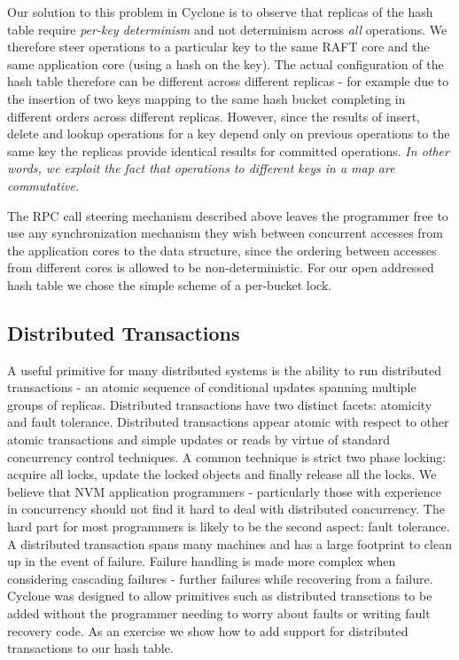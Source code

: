 \documentclass[letterpaper,twocolumn,10pt]{article}
\begin{document}
Our solution to this problem in Cyclone is to observe that replicas of the hash
table require \emph{per-key determinism} and not determinism across \emph{all}
operations. We therefore steer operations to a particular key to the same RAFT
core and the same application core (using a hash on the key).  The actual
configuration of the hash table therefore can be different across different
replicas - for example due to the insertion of two keys mapping to the same hash
bucket completing in different orders across different replicas. However, since
the results of insert, delete and lookup operations for a key depend only on
previous operations to the same key the replicas provide identical results for
committed operations. \emph{In other words, we exploit the fact that operations to
different keys in a map are commutative.}

The RPC call steering mechanism described above leaves the programmer free to
use any synchronization mechanism they wish between concurrent accesses from the
application cores to the data structure, since the ordering between accesses
from different cores is allowed to be non-deterministic. For our open addressed
hash table we chose the simple scheme of a per-bucket lock.

\subsection{Distributed Transactions}
A useful primitive for many distributed systems is the ability to run
distributed transactions - an atomic sequence of conditional updates spanning
multiple groups of replicas. Distributed transactions have two distinct facets:
atomicity and fault tolerance. Distributed transactions appear atomic with
respect to other atomic transactions and simple updates or reads by virtue of
standard concurrency control techniques. A common technique is strict two phase
locking: acquire all locks, update the locked objects and finally release all
the locks. We believe that NVM application programmers - particularly those
with experience in concurrency should not find it hard to deal with
distributed concurrency. The hard part for most programmers is likely to be the
second aspect: fault tolerance. A distributed transaction spans many machines
and has a large footprint to clean up in the event of failure. Failure handling
is made more complex when considering cascading failures - further failures
while recovering from a failure. Cyclone was designed to allow primitives such
as distributed transctions to be added without the programmer needing to worry
about faults or writing fault recovery code. As an exercise we show how to add
support for distributed transactions to our hash table.
\end{document}

